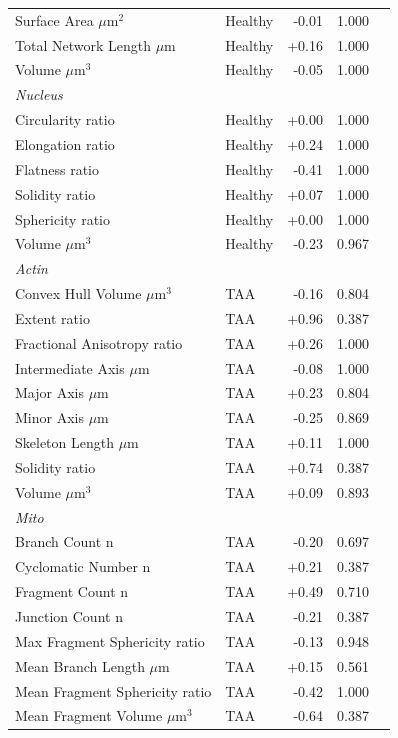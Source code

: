 \documentclass[11pt,a4paper]{article}
\begin{document}
\begin{longtable}{llrrr}
  Surface Area $\mu$m$^{2}$ & Healthy & -0.01 & 1.000 &  \\
  Total Network Length $\mu$m & Healthy & +0.16 & 1.000 &  \\
  Volume $\mu$m$^{3}$ & Healthy & -0.05 & 1.000 &  \\
\midrule
\multicolumn{5}{l}{\textit{Nucleus}} \\
  Circularity ratio & Healthy & +0.00 & 1.000 &  \\
  Elongation ratio & Healthy & +0.24 & 1.000 &  \\
  Flatness ratio & Healthy & -0.41 & 1.000 &  \\
  Solidity ratio & Healthy & +0.07 & 1.000 &  \\
  Sphericity ratio & Healthy & +0.00 & 1.000 &  \\
  Volume $\mu$m$^{3}$ & Healthy & -0.23 & 0.967 &  \\
\midrule
\multicolumn{5}{l}{\textit{Actin}} \\
  Convex Hull Volume $\mu$m$^{3}$ & TAA & -0.16 & 0.804 &  \\
  Extent ratio & TAA & +0.96 & 0.387 &  \\
  Fractional Anisotropy ratio & TAA & +0.26 & 1.000 &  \\
  Intermediate Axis $\mu$m & TAA & -0.08 & 1.000 &  \\
  Major Axis $\mu$m & TAA & +0.23 & 0.804 &  \\
  Minor Axis $\mu$m & TAA & -0.25 & 0.869 &  \\
  Skeleton Length $\mu$m & TAA & +0.11 & 1.000 &  \\
  Solidity ratio & TAA & +0.74 & 0.387 &  \\
  Volume $\mu$m$^{3}$ & TAA & +0.09 & 0.893 &  \\
\midrule
\multicolumn{5}{l}{\textit{Mito}} \\
  Branch Count n & TAA & -0.20 & 0.697 &  \\
  Cyclomatic Number n & TAA & +0.21 & 0.387 &  \\
  Fragment Count n & TAA & +0.49 & 0.710 &  \\
  Junction Count n & TAA & -0.21 & 0.387 &  \\
  Max Fragment Sphericity ratio & TAA & -0.13 & 0.948 &  \\
  Mean Branch Length $\mu$m & TAA & +0.15 & 0.561 &  \\
  Mean Fragment Sphericity ratio & TAA & -0.42 & 1.000 &  \\
  Mean Fragment Volume $\mu$m$^{3}$ & TAA & -0.64 & 0.387 &  \\

\end{longtable}
\end{document}

